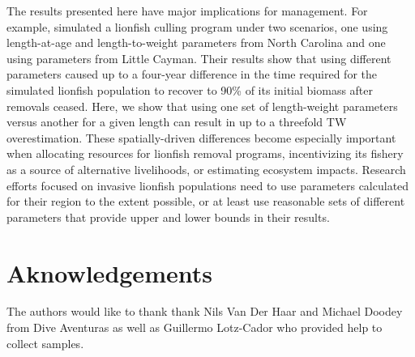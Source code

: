 \documentclass[fleqn,10pt,lineno]{wlpeerj} %
\begin{document}
The results presented here have major implications for management. For
example, \citet{edwards_2014} simulated a lionfish culling program under
two scenarios, one using length-at-age and length-to-weight parameters
from North Carolina and one using parameters from Little Cayman. Their
results show that using different parameters caused up to a four-year
difference in the time required for the simulated lionfish population to
recover to 90\% of its initial biomass after removals ceased. Here, we
show that using one set of length-weight parameters versus another for a
given length can result in up to a threefold TW overestimation. These
spatially-driven differences become especially important when allocating
resources for lionfish removal programs, incentivizing its fishery as a
source of alternative livelihoods, or estimating ecosystem impacts.
Research efforts focused on invasive lionfish populations need to use
parameters calculated for their region to the extent possible, or at
least use reasonable sets of different parameters that provide upper and
lower bounds in their results.

\section*{Aknowledgements}

The authors would like to thank thank Nils Van Der Haar and Michael
Doodey from Dive Aventuras as well as Guillermo Lotz-Cador who provided
help to collect samples.


\end{document}
